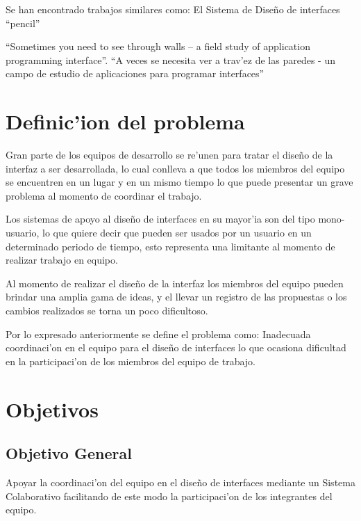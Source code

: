 \medskip

Se han encontrado trabajos similares como:
El Sistema de Dise\~no de interfaces ``pencil'' \cite{pencil2010}
  
``Sometimes you need to see through walls – a field study of application programming interface''. ``A veces se necesita ver a trav'ez de las paredes - un campo de estudio de aplicaciones para programar interfaces'' \cite{de2004sometimes}

\section{Definic'ion del problema}

Gran parte de los equipos de desarrollo se re'unen para tratar el dise\~no de la interfaz a ser desarrollada, lo cual conlleva a que todos los miembros del equipo se encuentren en un lugar y en un mismo tiempo lo que puede presentar un grave problema al momento de coordinar el trabajo. 

\medskip

Los sistemas de apoyo al dise\~no de interfaces en su mayor'ia son del tipo mono-usuario, lo que quiere decir que pueden ser usados por un usuario en un determinado periodo de tiempo, esto representa una limitante al momento de realizar trabajo en equipo.

Al momento de realizar el dise\~no de la interfaz los miembros del equipo pueden brindar una amplia gama de ideas, y el llevar un registro de las propuestas o los cambios realizados se torna un poco dificultoso.

\medskip

Por  lo expresado anteriormente se define el problema como:
Inadecuada coordinaci'on en el equipo para el dise\~no de interfaces lo que ocasiona dificultad en la participaci'on de los miembros del equipo de trabajo.


\section{Objetivos}

\subsection{Objetivo General}

Apoyar la coordinaci'on del equipo en el dise\~no de interfaces mediante un Sistema Colaborativo facilitando de este modo la participaci'on de los integrantes del equipo.

